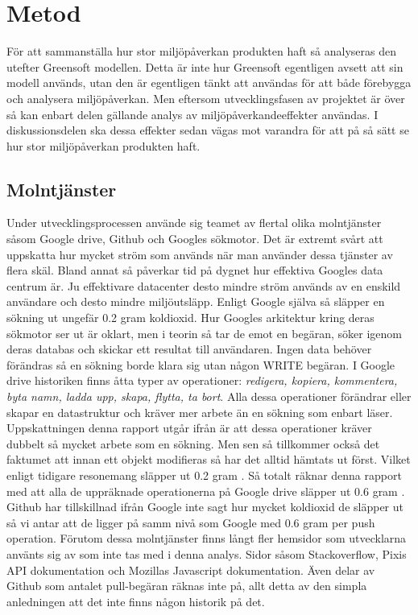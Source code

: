 \section{Metod}
\label{sec:joel_a-method}

För att sammanställa hur stor miljöpåverkan produkten haft så analyseras den utefter Greensoft modellen. Detta är inte hur Greensoft egentligen avsett att sin modell används, utan den är egentligen tänkt att användas för att både förebygga och analysera miljöpåverkan. Men eftersom utvecklingsfasen av projektet är över så kan enbart delen gällande analys av miljöpåverkandeeffekter användas. I diskussionsdelen ska dessa effekter sedan vägas mot varandra för att på så sätt se hur stor miljöpåverkan produkten haft.

\subsection{Molntjänster}
Under utvecklingsprocessen använde sig teamet av flertal olika molntjänster såsom Google drive, Github och Googles sökmotor. Det är extremt svårt att uppskatta hur mycket ström som används när man använder dessa tjänster av flera skäl. Bland annat så påverkar tid på dygnet hur effektiva Googles data centrum är\cite{google-warehouse}. Ju effektivare datacenter desto mindre ström används av en enskild användare och desto mindre miljöutsläpp. Enligt Google själva så släpper en sökning ut ungefär 0.2 gram koldioxid\cite{google-blog}. Hur Googles arkitektur kring deras sökmotor ser ut är oklart, men i teorin så tar de emot en begäran, söker igenom deras databas och skickar ett resultat till användaren. Ingen data behöver förändras så en sökning borde klara sig utan någon WRITE begäran. I Google drive historiken finns åtta typer av operationer: \textit{redigera, kopiera, kommentera, byta namn, ladda upp, skapa, flytta, ta bort}. Alla dessa operationer förändrar eller skapar en datastruktur och kräver mer arbete än en sökning som enbart läser. Uppskattningen denna rapport utgår ifrån är att dessa operationer kräver dubbelt så mycket arbete som en sökning. Men sen så tillkommer också det faktumet att innan ett objekt modifieras så har det alltid hämtats ut först. Vilket enligt tidigare resonemang släpper ut 0.2 gram . Så totalt räknar denna rapport med att alla de uppräknade operationerna på Google drive släpper ut 0.6 gram . Github har tillskillnad ifrån Google inte sagt hur mycket koldioxid de släpper ut så vi antar att de ligger på samm nivå som Google med 0.6 gram  per push operation. Förutom dessa molntjänster finns långt fler hemsidor som utvecklarna använts sig av som inte tas med i denna analys. Sidor såsom Stackoverflow, Pixis API dokumentation och Mozillas Javascript dokumentation. Även delar av Github som antalet pull-begäran räknas inte på, allt detta av den simpla anledningen att det inte finns någon historik på det.
